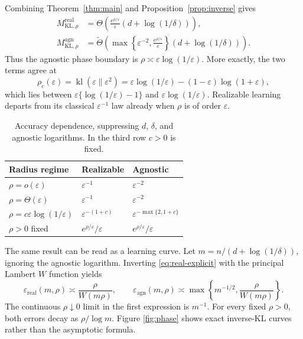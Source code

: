 \documentclass{article}
\theoremstyle{remark}
\newcommand{\kl}{\operatorname{kl}}
\newcommand{\eps}{\varepsilon}
\begin{document}
Combining Theorem~\ref{thm:main} and Proposition~\ref{prop:inverse} gives
\begin{align}
 M^{\mathrm{real}}_{\mathrm{KL},\rho}
 &=\Theta\!\left(
 \frac{e^{\rho/\eps}}{\eps}(d+\log(1/\delta))\right),
 \label{eq:real-explicit}\\
 M^{\mathrm{agn}}_{\mathrm{KL},\rho}
 &=\widetilde\Theta\!\left(
 \max\left\{\eps^{-2},\frac{e^{\rho/\eps}}{\eps}\right\}
 (d+\log(1/\delta))\right).
 \label{eq:agn-explicit}
\end{align}
Thus the agnostic phase boundary is
$\rho\asymp\eps\log(1/\eps)$.  More exactly, the two terms agree at
\begin{equation}
 \rho_c(\eps)=\kl(\eps\|\eps^2)
 =\eps\log(1/\eps)-(1-\eps)\log(1+\eps),
 \label{eq:exact-crossover}
\end{equation}
which lies between $\eps\{\log(1/\eps)-1\}$ and
$\eps\log(1/\eps)$.  Realizable learning departs from its classical
$\eps^{-1}$ law already when $\rho$ is of order $\eps$.

\begin{table}[b]
\centering
\caption{Accuracy dependence, suppressing $d$, $\delta$, and agnostic
logarithms.  In the third row $c>0$ is fixed.}
\label{tab:regimes}
\small
\begin{tabular}{lll}
\toprule
Radius regime & Realizable & Agnostic \\
\midrule
$\rho=o(\eps)$ & $\eps^{-1}$ & $\eps^{-2}$ \\
$\rho=\Theta(\eps)$ & $\eps^{-1}$ & $\eps^{-2}$ \\
$\rho=c\eps\log(1/\eps)$ & $\eps^{-(1+c)}$ &
$\eps^{-\max\{2,1+c\}}$ \\
$\rho>0$ fixed & $e^{\rho/\eps}/\eps$ & $e^{\rho/\eps}/\eps$ \\
\bottomrule
\end{tabular}
\end{table}

The same result can be read as a learning curve.  Let
$m=n/(d+\log(1/\delta))$, ignoring the agnostic logarithm.  Inverting
\eqref{eq:real-explicit} with the principal Lambert $W$ function
\citep{corless1996lambertw} yields
\begin{equation}
 \eps_{\mathrm{real}}(m,\rho)\asymp\frac{\rho}{W(m\rho)},
 \qquad
 \eps_{\mathrm{agn}}(m,\rho)\asymp
 \max\left\{m^{-1/2},\frac{\rho}{W(m\rho)}\right\}.
 \label{eq:learning-curves}
\end{equation}
The continuous $\rho\downarrow0$ limit in the first expression is $m^{-1}$.
For every fixed $\rho>0$, both errors decay as $\rho/\log m$.  Figure
\ref{fig:phase} shows exact inverse-KL curves rather than the asymptotic
formula.
\end{document}
